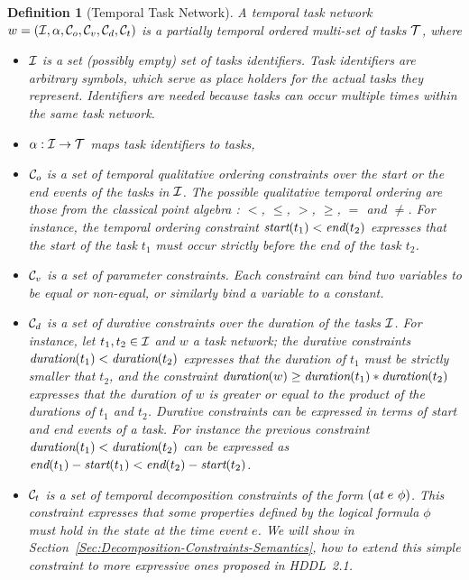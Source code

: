 \documentclass[letterpaper]{article} %
\newtheorem{definition}{Definition}
\newcommand{\at}{\text{\it at}}
\newcommand{\duration}{\text{\it duration}}
\newcommand{\tstart}{\text{\it start}}
\newcommand{\tend}{\text{\it end}}
\begin{document}
\begin{definition}[Temporal Task Network]
A temporal task network $w = ({\cal{I}}, \alpha, {\cal{C}}_o, {\cal{C}}_v, {\cal{C}}_d, {\cal{C}}_t)$ is a partially temporal ordered multi-set of tasks $\cal{T}$, where
\begin{itemize}

    \item $\cal{I}$ is a set (possibly empty) set of tasks identifiers. Task identifiers are arbitrary symbols, which serve as place holders for the actual tasks they represent. Identifiers are needed because tasks can occur multiple times within the same task network.

    \item $\alpha: {\cal{I}} \rightarrow {\cal{T}}$ maps task identifiers to tasks,

    \item ${\cal{C}}_o$ is a set of temporal qualitative ordering constraints over the start or the end events of the tasks in $\cal{I}$. The possible qualitative temporal ordering are those from the classical point algebra \cite{broxvall03}: $<$, $\leq$, $>$, $\geq$, $=$ and $\neq$. For instance, the temporal ordering constraint $\tstart(t_1) < \tend(t_2)$ expresses that the start of the task $t_1$ must occur strictly  before the end of the task $t_2$.

    \item ${\cal{C}}_v$ is a set of parameter constraints. Each constraint can bind two variables to be equal or non-equal, or similarly bind a variable to a constant. %

    \item ${\cal{C}}_d$ is a set of durative constraints over the duration of the tasks $\cal{I}$. For instance, let $t_1, t_2 \in {\cal{I}}$ and $w$ a task network; the durative constraints $\duration(t_1) < \duration(t_2)$ expresses that the duration of $t_1$ must be strictly smaller that $t_2$, and the constraint $\duration(w) \geq \duration(t_1) * \duration(t_2)$ expresses that the duration of $w$ is greater or equal to the product of the durations of $t_1$ and $t_2$. Durative constraints can be expressed in terms of start and end events of a task. For instance the previous constraint $\duration(t_1) < \duration(t_2)$ can be expressed as  $\tend(t_1) - \tstart(t_1) < \tend(t_2) - \tstart(t_2)$.

    \item ${\cal{C}}_t$ is a set of temporal decomposition constraints of the form $(\at \ e \ \phi)$. This constraint expresses that some properties defined by the logical formula $\phi$ must hold in the state at the time event $e$. We will show in Section~\ref{Sec:Decomposition-Constraints-Semantics}, how to extend this simple constraint to more expressive ones proposed in HDDL~2.1.
   \end{itemize}
\end{definition}
\end{document}
